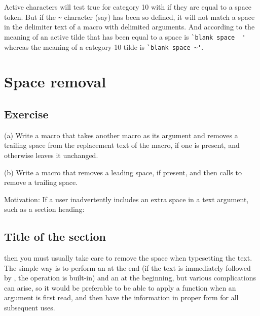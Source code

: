 Active characters will test true for category 10 with  if they are
\cmd{\let} equal to a space token. But if the \verb?~? character (say) has been so
defined, it will not match a space in the delimiter text of a macro with
delimited arguments. And according to \cmd{\tracingcommands} the meaning of an
active tilde that has been \cmd{\let} equal to a space is 
\verb?`blank space  '?
whereas the meaning of a category-10 tilde is \verb?`blank space ~'?.



\chapter{Space removal}

\section{Exercise}

\begin{comment}
Date: 05 Nov 1993 16:34:28 -0500 (EST)
From: Michael Downes <MJD@MATH.AMS.ORG>
Subject: Around the Bend #15
To: info-tex@shsu.edu
X-ListName: TeX-Related Network Discussion List <INFO-TeX@SHSU.edu>
\end{comment}


(a) Write a macro \cmd{\trimspace} that takes another macro as its argument and
removes a trailing space from the replacement text of the macro, if one
is present, and otherwise leaves it unchanged.

(b) Write a macro \cmd{\trimspaces} that removes a leading space, if
present, and then calls \cmd{\trimspace} to remove a trailing space.


Motivation: If a user inadvertently includes an extra space
in a text argument, such as a section heading:
\begin{lcode}
  \section{Title of the section }
\end{lcode}
then you must usually take care to remove the space when typesetting
the text. The simple way is to perform an \cmd{\unskip} at the end (if the
text is immediately followed by , the \cmd{\unskip} operation is
built-in) and an \cmd{\ignorespaces} at the beginning, but various
complications can arise, so it would be preferable to be able to apply
a \cmd{\trimspaces} function when an argument is first read, and then have
the information in proper form for all subsequent uses.

